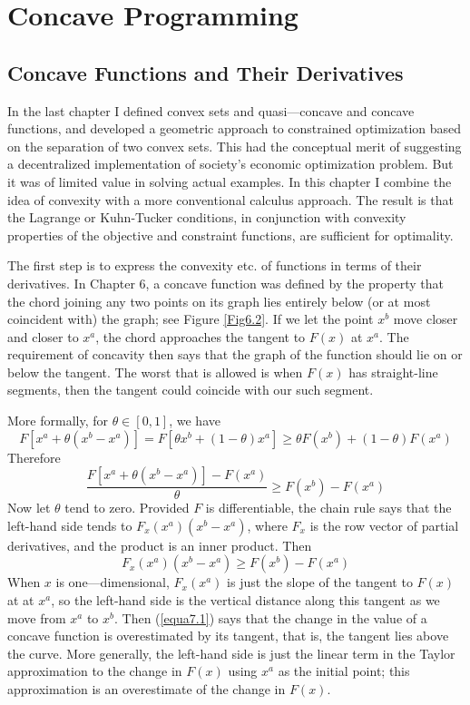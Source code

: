 \chapter{Concave Programming}

\section*{Concave Functions and Their Derivatives}

In the last chapter I defined convex sets and quasi—concave and concave functions, and developed a geometric approach to constrained optimization based on the separation of two convex sets. This had the conceptual merit of suggesting a decentralized implementation of society's economic optimization problem. But it was of limited value in solving actual examples. In this chapter I combine the idea of convexity with a more conventional calculus approach. The result is that the Lagrange or Kuhn-Tucker conditions, in conjunction with convexity properties of the objective and constraint functions, are sufficient for optimality.

The first step is to express the convexity etc. of functions in terms of their derivatives. In Chapter 6, a concave function was defined by the property that the chord joining any two points on its graph lies entirely below (or at most coincident with) the graph; see Figure \ref{Fig6.2}. If we let the point $x^b$ move closer and closer to $x^a$, the chord approaches the tangent to $F(x)$ at $x^a$. The requirement of concavity then says that the graph of the function should lie on or below the tangent. The worst that is allowed is when $F(x)$ has straight-line segments, then the tangent could coincide with our such segment.

More formally, for $\theta \in [0,1]$, we have
\begin{equation*}
F[x^a + \theta(x^b - x^a)] = F[\theta x^b +(1-\theta)x^a] \geq \theta F(x^b) + (1-\theta) F(x^a)
\end{equation*}
Therefore
\begin{equation*}
   \dfrac{F[x^a + \theta(x^b - x^a)] - F(x^a)}{\theta} \geq  F(x^b) - F(x^a)
\end{equation*}
Now let $\theta$ tend to zero. Provided $F$ is differentiable, the chain rule says that the left-hand side tends to $F_x(x^a)(x^b - x^a)$, where $F_x$ is the row vector of partial derivatives, and the product is an inner product. Then
\begin{equation} \label{equa7.1}
  F_x(x^a)(x^b - x^a) \geq F(x^b) - F(x^a)
\end{equation}
When $x$ is one—dimensional, $F_x(x^a)$ is just the slope of the tangent to $F(x)$ at at $x^a$, so the left-hand side is the vertical distance along this tangent as we move from $x^a$ to $x^b$. Then (\ref{equa7.1}) says that the change in the value of a concave function is overestimated by its tangent, that is, the tangent lies above the curve. More generally, the left-hand side is just the linear term in the Taylor approximation to the change in $F(x)$ using $x^a$ as the initial point; this approximation is an overestimate of the change in $F(x)$.

